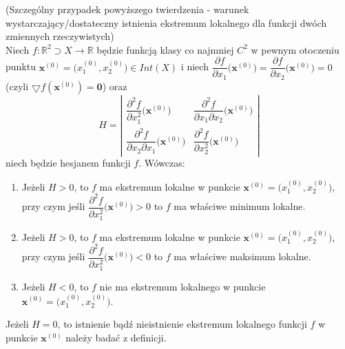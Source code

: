 \begin{tw}{(Szczególny przypadek powyższego twierdzenia - warunek wystarczający/dostateczny istnienia ekstremum lokalnego dla funkcji dwóch zmiennych rzeczywistych)}\\
Niech $f:\mathbb{R}^2\supset X\rightarrow\mathbb{R}$ będzie funkcją klasy co najmniej $C^2$ w pewnym otoczeniu punktu $\textbf{x}^{(0)}=\big(x_1^{(0)},x_2^{(0)}\big)\in Int(X)$ i niech $\dfrac{\partial f}{\partial x_1}\big(\textbf{x}^{(0)}\big)=\dfrac{\partial f}{\partial x_2}\big(\textbf{x}^{(0)}\big)=0$ (czyli $\bigtriangledown f(\textbf{x}^{(0)})=\textbf{0}$) oraz 
$$H=\left| \begin{array}{cc}
\dfrac{\partial^2f}{\partial x_1^2}\big(\textbf{x}^{(0)}\big) & \dfrac{\partial^2f}{\partial x_1\partial x_2}\big(\textbf{x}^{(0)}\big)\\
\dfrac{\partial^2f}{\partial x_2\partial x_1}\big(\textbf{x}^{(0)}\big) & \dfrac{\partial^2f}{\partial x_2^2}\big(\textbf{x}^{(0)}\big)
\end{array} \right|$$
niech będzie hesjanem funkcji $f$. Wówczas:
\begin{enumerate}[\rm 1.]
\item
Jeżeli $H>0$, to $f$ ma ekstremum lokalne w punkcie $\textbf{x}^{(0)}=\big(x_1^{(0)},x_2^{(0)}\big)$, przy czym jeśli $\dfrac{\partial^2f}{\partial x_1^2}\big(\textbf{x}^{(0)}\big)>0$ to $f$ ma właściwe minimum lokalne.
\item
Jeżeli $H>0$, to $f$ ma ekstremum lokalne w punkcie $\textbf{x}^{(0)}=\big(x_1^{(0)},x_2^{(0)}\big)$, przy czym jeśli $\dfrac{\partial^2f}{\partial x_1^2}\big(\textbf{x}^{(0)}\big)<0$ to $f$ ma właściwe maksimum lokalne.
\item
Jeżeli $H<0$, to $f$ nie ma ekstremum lokalnego w punkcie $\textbf{x}^{(0)}=\big(x_1^{(0)},x_2^{(0)}\big)$.
\end{enumerate}
\end{tw}

\begin{uwg}
Jeżeli $H=0$, to istnienie bądź nieistnienie ekstremum lokalnego funkcji $f$ w punkcie $\textbf{x}^{(0)}$ należy badać z definicji.
\end{uwg}

